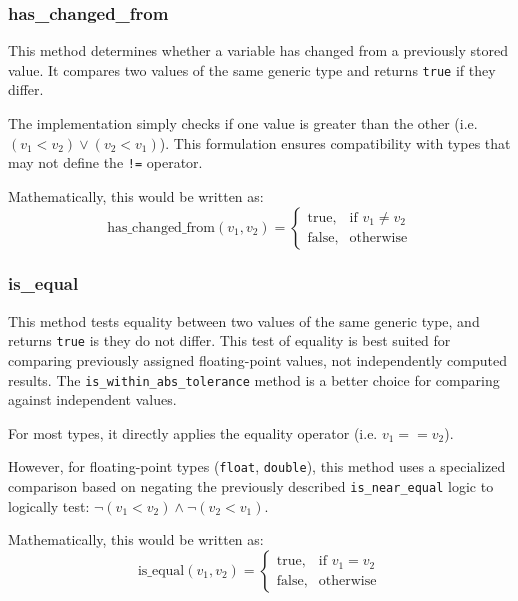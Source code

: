 \documentclass[11pt,fleqn]{report}
\begin{document}
\subsubsection{has\_changed\_from}

This method determines whether a variable has changed
from a previously stored value. It compares two values of the same generic type and returns
\texttt{true} if they differ. 

The implementation simply checks if one value is 
greater than the other (i.e. $(v_1 < v_2) \lor (v_2 < v_1)$). 
This formulation ensures compatibility with types that may not define the
\texttt{!=} operator.

Mathematically, this would be written as:
\[
\text{has\_changed\_from}(v_1, v_2) =
\begin{cases}
\text{true}, & \text{if } v_1 \ne v_2 \\
\text{false}, & \text{otherwise}
\end{cases}
\]

\subsubsection{is\_equal}

This method tests equality between two values of the same generic type, and 
returns \texttt{true} is they do not differ. 
This test of equality is best suited for comparing previously assigned 
floating-point values, not independently computed results. The 
\texttt{is\_within\_abs\_tolerance} method is a better choice for comparing against
independent values.

For most types, it directly applies the equality operator (i.e. $v_1 == v_2$).

However, for floating-point types (\texttt{float}, \texttt{double}), this
method uses a specialized comparison based on negating the previously described
\texttt{is\_near\_equal} logic to logically test: 
$\lnot(v_1 < v_2) \land \lnot(v_2 < v_1)$.

Mathematically, this would be written as:
\[
\text{is\_equal}(v_1, v_2) =
\begin{cases}
\text{true}, & \text{if } v_1 = v_2 \\
\text{false}, & \text{otherwise}
\end{cases}
\]
\end{document}
